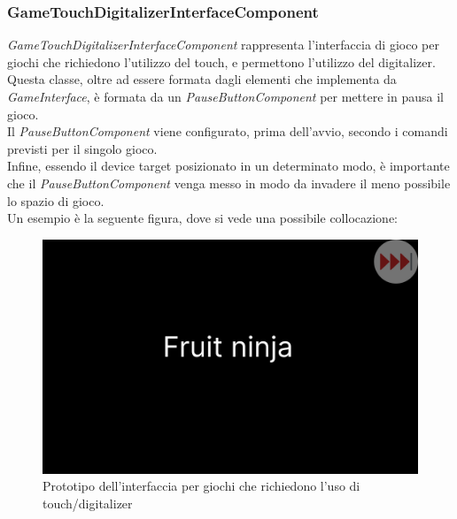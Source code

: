 \subsubsection{GameTouchDigitalizerInterfaceComponent}
\emph{GameTouchDigitalizerInterfaceComponent} rappresenta l'interfaccia di gioco per giochi che richiedono l'utilizzo del touch, e permettono l'utilizzo del digitalizer.\\
Questa classe, oltre ad essere formata dagli elementi che implementa da \emph{GameInterface}, è formata da un \emph{PauseButtonComponent} per mettere in pausa il gioco.\\
Il \emph{PauseButtonComponent} viene configurato, prima dell'avvio, secondo i comandi previsti per il singolo gioco.\\
Infine, essendo il device target posizionato in un determinato modo, è importante che il \emph{PauseButtonComponent} venga messo in modo da invadere il meno possibile lo spazio di gioco.\\
Un esempio è la seguente figura, dove si vede una possibile collocazione:
\begin{figure}[h]
    \centering
    \includegraphics[width=340pt]{ProgettazioneTecnica/TouchDigitMockup.png}
    \caption{Prototipo dell'interfaccia per giochi che richiedono l'uso di touch/digitalizer}
    \label{fig:touchDigit}
\end{figure}
\newpage
